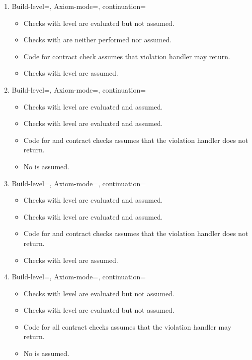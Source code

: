 \begin{enumerate}
\item Build-level=, Axiom-mode=, continuation=
\begin{itemize}
  \item Checks with  level are evaluated but not assumed.
  \item Checks with  are neither performed nor assumed.
  \item Code for  contract check assumes 
	  that violation handler may return.
  \item Checks with  level are assumed.
\end{itemize}

\item Build-level=, Axiom-mode=, continuation=
\begin{itemize}
  \item Checks with  level are evaluated and assumed.
  \item Checks with  level are evaluated and assumed.
  \item Code for  and  contract checks 
	  assumes that the violation handler does not return.
  \item No  is assumed.
\end{itemize}

\item Build-level=, Axiom-mode=, continuation=
\begin{itemize}
  \item Checks with  level are evaluated and assumed.
  \item Checks with  level are evaluated and assumed.
  \item Code for  and  contract checks 
	  assumes that the violation handler does not return.
  \item Checks with  level are assumed.
\end{itemize}

\item Build-level=, Axiom-mode=, continuation=
\begin{itemize}
  \item Checks with  level are evaluated but not assumed.
  \item Checks with  level are evaluated but not assumed.
  \item Code for all contract checks assumes that the violation handler may return.
  \item No  is assumed.
\end{itemize}


\end{enumerate}
